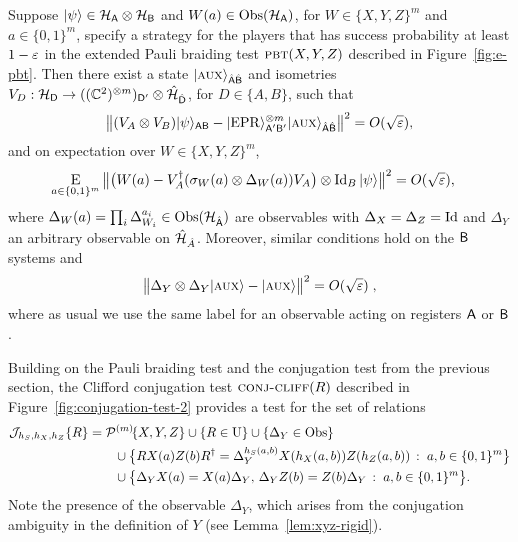 \begin{lemma}\label{lem:xyz-rigid}
Suppose $|\psi\rangle\in\mathcal{H}_{\textsf{A}}\otimes \mathcal{H}_{\textsf{B}}$ and $W(a) \in \mathrm{Obs}(\mathcal{H}_{\textsf{A}})$, for $W\in \{X,Y,Z\}^m$ and $a\in\{0,1\}^m$, specify a strategy for the players that has success probability at least $1-\varepsilon$ in the extended Pauli braiding test $\textsc{pbt}(X,Y,Z)$ described in Figure~\ref{fig:e-pbt}. 
Then there exist a state $|\textsc {aux}\rangle_{\hat{{\textsf{A}}}\hat{{\textsf{B}}}}$  and  isometries $V_D:\mathcal{H}_{\textsf{D}} \to ((\mathbb{C}^2)^{\otimes m})_{{\textsf{D}}'}  \otimes \hat{\mathcal{H}}_{\hat{{\textsf{D}}}}$, for $D\in\{A,B\}$, such that
$$\big\| (V_A \otimes V_B) |\psi\rangle_{{\textsf{AB}}} - |{\rm EPR}\rangle_{{\textsf{A}}'{\textsf{B}}'}^{\otimes m} |\textsc {aux}\rangle_{\hat{{\textsf{A}}}\hat{{\textsf{B}}}} \big\|^2 = O(\sqrt{\varepsilon}),$$
and on expectation over $W\in \{X,Y,Z\}^m$,
\begin{align}\label{eq:test-sigmay}
 \mathop{\textsc{E}}_{a\in\{0,1\}^m} \big\| \big(W(a) -V_A^\dagger (\sigma_W(a) \otimes \Delta_W(a)) V_A\big) \otimes \mathop{\rm Id}\nolimits_B |\psi\rangle \big\|^2 &= O(\sqrt{\varepsilon}),
\end{align}
where $\Delta_W(a) = \prod_i \Delta_{W_i}^{a_i} \in \mathrm{Obs}({\mathcal{H}}_{\hat{{\textsf{A}}}})$ are observables with $\Delta_{X}=\Delta_{Z}=\mathop{\rm Id}\nolimits$ and $\Delta_{Y}$ an arbitrary observable on $\hat{\mathcal{H}}_{\hat{A}}$. Moreover, similar conditions hold on the ${\textsf{B}}$ systems and
	$$ \big\|\Delta_Y \otimes \Delta_Y |\textsc {aux}\rangle - |\textsc {aux}\rangle \big\|^2 = O(\sqrt{\varepsilon})\;,$$
	where as usual we use the same label for an observable acting on registers ${\textsf{A}}$ or ${\textsf{B}}$. 
\end{lemma} 


Building on the Pauli braiding test and the conjugation test from the previous section, the Clifford conjugation test $\textsc{conj-cliff}(R)$ described in Figure~\ref{fig:conjugation-test-2} 
 provides a test for the set of relations 
\begin{align}
\mathcal{J}\!_{h_S,h_X,h_Z}\{R\} &= \mathcal{P}^{(m)}\!\{X,Y,Z\}  \cup \{R\in \mathrm{U}\} \cup \{\Delta_Y\in\mathrm{Obs}\}\notag\\
&\qquad \cup \big\{ R X(a)Z(b)R^\dagger = \Delta_Y^{h_S(a,b)}X(h_X(a,b))Z(h_Z(a,b))\,:\; a,b\in\{0,1\}^m\big\} \notag\\
&\qquad \cup \big\{ \Delta_Y X(a) = X(a)\Delta_Y,\,\Delta_Y Z(b)=Z(b)\Delta_Y\,:\; a,b\in\{0,1\}^m\big\}.\label{eq:def-hr}
\end{align}
Note the presence of the observable $\Delta_Y$, which arises from the conjugation ambiguity in the definition of $Y$ (see Lemma~\ref{lem:xyz-rigid}). 

